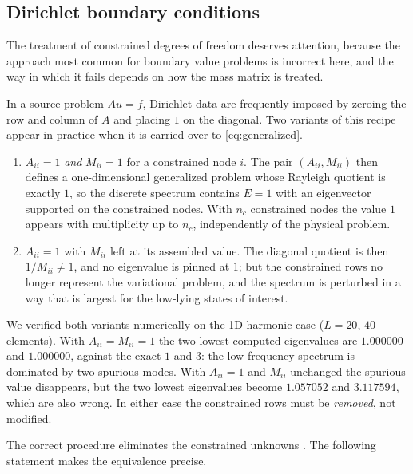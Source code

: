 \documentclass[pdflatex,sn-mathphys-num]{sn-jnl}
\theoremstyle{thmstyleone}%
\theoremstyle{thmstyletwo}%
\theoremstyle{thmstylethree}%
\begin{document}
\subsection{Dirichlet boundary conditions}\label{sec:dirichlet}

The treatment of constrained degrees of freedom deserves attention, because the
approach most common for boundary value problems is incorrect here, and the way
in which it fails depends on how the mass matrix is treated.

In a source problem $Au = f$, Dirichlet data are frequently imposed by zeroing
the row and column of $A$ and placing $1$ on the diagonal. Two variants of this
recipe appear in practice when it is carried over to \eqref{eq:generalized}.

\begin{enumerate}
  \item $A_{ii} = 1$ \emph{and} $M_{ii} = 1$ for a constrained node $i$. The
        pair $(A_{ii}, M_{ii})$ then defines a one-dimensional generalized
        problem whose Rayleigh quotient is exactly $1$, so the discrete
        spectrum contains $E = 1$ with an eigenvector supported on the
        constrained nodes. With $n_c$ constrained nodes the value $1$ appears
        with multiplicity up to $n_c$, independently of the physical problem.
  \item $A_{ii} = 1$ with $M_{ii}$ left at its assembled value. The diagonal
        quotient is then $1/M_{ii} \neq 1$, and no eigenvalue is pinned at
        $1$; but the constrained rows no longer represent the variational
        problem, and the spectrum is perturbed in a way that is largest for the
        low-lying states of interest.
\end{enumerate}

We verified both variants numerically on the 1D harmonic case
($L = 20$, $40$ elements). With $A_{ii} = M_{ii} = 1$ the two lowest computed
eigenvalues are $1.000000$ and $1.000000$, against the exact $1$ and $3$: the
low-frequency spectrum is dominated by two spurious modes. With $A_{ii} = 1$ and
$M_{ii}$ unchanged the spurious value disappears, but the two lowest eigenvalues
become $1.057052$ and $3.117594$, which are also wrong. In either case the
constrained rows must be \emph{removed}, not modified.

The correct procedure eliminates the constrained unknowns \cite{strang1973}.
The following statement makes the equivalence precise.
\end{document}
